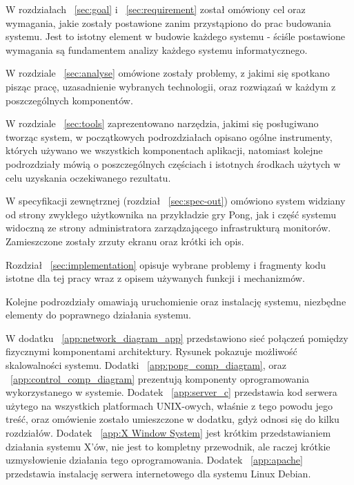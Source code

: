 W rozdziałach ~\ref{sec:goal} i ~\ref{sec:requirement} został omówiony cel oraz wymagania, jakie zostały postawione zanim przystąpiono do prac budowania systemu. Jest to istotny element w budowie każdego systemu - ściśle postawione wymagania są fundamentem analizy każdego systemu informatycznego.

\par
W rozdziale ~\ref{sec:analyse} omówione zostały problemy, z jakimi się spotkano pisząc pracę, uzasadnienie wybranych technologii, oraz rozwiązań w każdym z poszczególnych komponentów.

\par

W rozdziale ~\ref{sec:tools} zaprezentowano narzędzia, jakimi się posługiwano tworząc system, w początkowych podrozdziałach opisano ogólne instrumenty, których używano we wszystkich komponentach aplikacji, natomiast kolejne podrozdziały mówią o poszczególnych częściach i istotnych środkach użytych w celu uzyskania oczekiwanego rezultatu.

\par

W specyfikacji zewnętrznej (rozdział  ~\ref{sec:spec-out}) omówiono system widziany od strony zwykłego użytkownika na przykładzie gry Pong, jak i część systemu widoczną ze strony administratora zarządzającego infrastrukturą monitorów. Zamieszczone zostały zrzuty ekranu oraz krótki ich opis.

\par

Rozdział ~\ref{sec:implementation} opisuje wybrane problemy i fragmenty kodu istotne dla tej pracy wraz z opisem używanych funkcji i mechanizmów.

\par

Kolejne podrozdziały omawiają uruchomienie oraz instalację systemu, niezbędne elementy do poprawnego działania systemu. 

\par

W dodatku ~\ref{app:network_diagram_app} przedstawiono sieć połączeń pomiędzy fizycznymi komponentami architektury. Rysunek pokazuje możliwość skalowalności systemu.
Dodatki ~\ref{app:pong_comp_diagram}, oraz ~\ref{app:control_comp_diagram} prezentują komponenty oprogramowania wykorzystanego w systemie.
Dodatek ~\ref{app:server_c} przedstawia kod serwera użytego na wszystkich platformach UNIX-owych, właśnie z tego powodu jego treść, oraz omówienie zostało umieszczone w dodatku, gdyż odnosi się do kilku rozdziałów.
Dodatek ~\ref{app:X Window System} jest krótkim przedstawianiem działania systemu X'ów, nie jest to kompletny przewodnik, ale raczej krótkie uzmysłowienie działania tego oprogramowania.
Dodatek ~\ref{app:apache} przedstawia instalację serwera internetowego dla systemu Linux Debian. 

